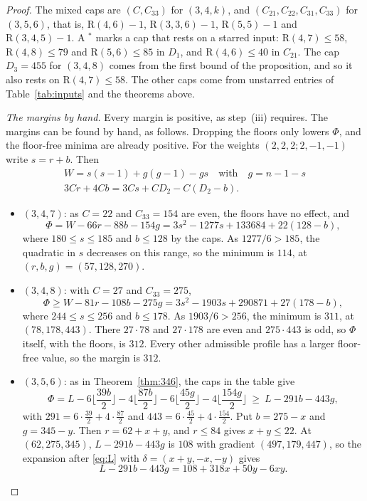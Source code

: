 \documentclass[11pt]{article}
\theoremstyle{spacedplain}
\theoremstyle{spaceddef}
\theoremstyle{spacedremark}
\newcommand{\R}{\mathrm{R}}
\begin{document}
\begin{proof}
The mixed caps are $(C,C_{33})$ for $(3,4,k)$, and $(C_{21},C_{22},C_{31},C_{33})$ for $(3,5,6)$, that is, $\R(4,6)-1$, $\R(3,3,6)-1$, $\R(5,5)-1$ and $\R(3,4,5)-1$.
A $^*$ marks a cap that rests on a starred input: $\R(4,7)\le 58$, $\R(4,8)\le 79$ and $\R(5,6)\le 85$ in $D_1$, and $\R(4,6)\le 40$ in $C_{21}$.
The cap $D_3=455$ for $(3,4,8)$ comes from the first bound of the proposition, and so it also rests on $\R(4,7)\le 58$.
The other caps come from unstarred entries of Table~\ref{tab:inputs} and the theorems above.

\emph{The margins by hand.}
Every margin is positive, as step~(iii) requires.
The margins can be found by hand, as follows.
Dropping the floors only lowers $\Phi$, and the floor-free minima are already positive.
For the weights $(2,2,2;2,-1,-1)$ write $s=r+b$.
Then
\begin{gather*}
W=s(s-1)+g(g-1)-gs\quad\text{with}\quad g=n-1-s\\
3Cr+4Cb=3Cs+CD_2-C(D_2-b).
\end{gather*}

\begin{itemize}[leftmargin=1.2em]
\item $(3,4,7)$: as $C=22$ and $C_{33}=154$ are even, the floors have no effect, and
\[
\Phi=W-66r-88b-154g=3s^2-1277s+133684+22(128-b),
\]
where $180\le s\le 185$ and $b\le 128$ by the caps.
As $1277/6>185$, the quadratic in $s$ decreases on this range, so the minimum is $114$, at $(r,b,g)=(57,128,270)$.

\item $(3,4,8)$: with $C=27$ and $C_{33}=275$,
\[
\Phi\ge W-81r-108b-275g=3s^2-1903s+290871+27(178-b),
\]
where $244\le s\le 256$ and $b\le 178$.
As $1903/6>256$, the minimum is $311$, at $(78,178,443)$.
There $27\cdot 78$ and $27\cdot 178$ are even and $275\cdot 443$ is odd, so $\Phi$ itself, with the floors, is $312$.
Every other admissible profile has a larger floor-free value, so the margin is $312$.

\item $(3,5,6)$: as in Theorem~\ref{thm:346}, the caps in the table give
\[
\Phi=L-6\Big\lfloor\frac{39b}{2}\Big\rfloor-4\Big\lfloor\frac{87b}{2}\Big\rfloor-6\Big\lfloor\frac{45g}{2}\Big\rfloor-4\Big\lfloor\frac{154g}{2}\Big\rfloor\ \ge\ L-291b-443g,
\]
with $291=6\cdot\frac{39}2+4\cdot\frac{87}2$ and $443=6\cdot\frac{45}2+4\cdot\frac{154}2$.
Put $b=275-x$ and $g=345-y$.
Then $r=62+x+y$, and $r\le 84$ gives $x+y\le 22$.
At $(62,275,345)$, $L-291b-443g$ is $108$ with gradient $(497,179,447)$, so the expansion after \eqref{eq:L} with $\delta=(x+y,-x,-y)$ gives
\[
L-291b-443g=108+318x+50y-6xy.
\]


\end{itemize}
\end{proof}
\end{document}
